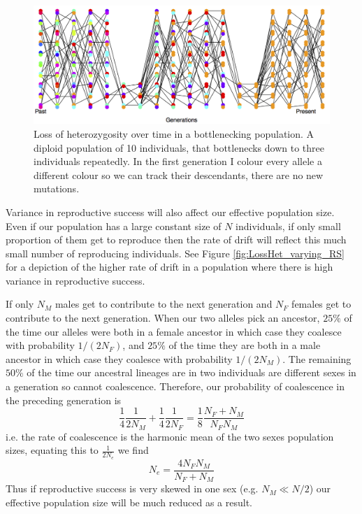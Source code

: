 \begin{figure}
\begin{center}
\includegraphics[width= \textwidth]{figures/Loss_of_he_col_alleles_varying_pop_dark.png}
\end{center}
\caption{Loss of heterozygosity over time in a bottlenecking population. A diploid population of 10 individuals, that bottlenecks
  down to three individuals repeatedly. In the first generation I colour every allele a different
colour so we can track their descendants, there are no new
  mutations.} \label{fig:LossHet_varying_pop}  
\end{figure} 


Variance in reproductive success will also affect our effective
population size. Even if our population has a large constant size of $N$
individuals, if only small proportion of them get to reproduce then
the rate of drift will reflect this much small number of reproducing
individuals. See Figure \ref{fig:LossHet_varying_RS} for a depiction of the higher rate of drift
in a population where there is high variance in reproductive success.

 If only $N_M$ males get to contribute to the next
generation and $N_F$ females get to contribute to the next
generation. When our two alleles pick an ancestor, $25\%$ of the time
our alleles were both in a female ancestor in which case they coalesce
with probability $1/(2N_F)$, and $25\%$ of the time they are both in a
male ancestor in which case they coalesce with probability
$1/(2N_M)$. The remaining $50\%$ of the time our ancestral lineages
are in two individuals are different sexes in a generation so cannot
coalescence.  Therefore, our probability of coalescence in the preceding
generation is
\begin{equation}
\frac{1}{4}\frac{1}{2N_M}+\frac{1}{4}\frac{1}{2N_F} =
\frac{1}{8}\frac{N_F+N_M}{N_FN_M} 
\end{equation}
i.e. the rate of coalescence is the harmonic mean of the two
sexes population sizes, 
equating this to $\frac{1}{2N_e}$ we find
\begin{equation}
N_e = \frac{4N_FN_M}{N_F+N_M}
\end{equation}
Thus if reproductive success is very skewed in one sex (e.g. $N_M \ll
N/2$) our effective population size will be much reduced as a result.\\


